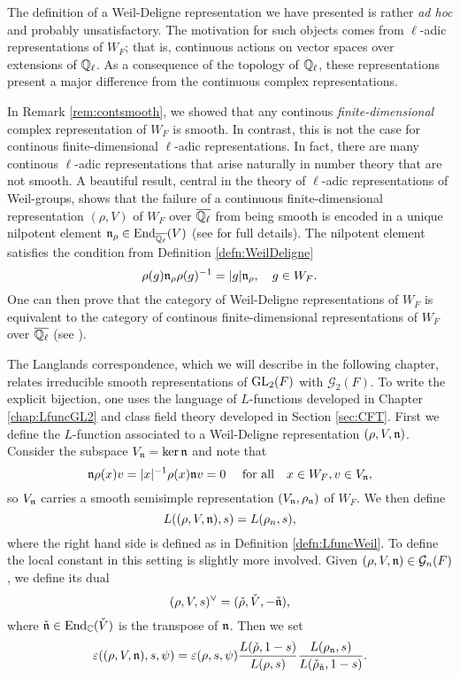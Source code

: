 \begin{rem}
    The definition of a Weil-Deligne representation we have presented is rather \textit{ad hoc} and probably unsatisfactory. The motivation for such objects comes from $\ell$-adic representations of $W_F$; that is, continuous actions on vector spaces over extensions of $\mathbb{Q}_\ell$. As a consequence of the topology of $\mathbb{Q}_\ell$, these representations present a major difference from the continuous complex representations. 

    In Remark \ref{rem:contsmooth}, we showed that any continous \textit{finite-dimensional} complex representation of $W_F$ is smooth. In contrast, this is not the case for continous finite-dimensional $\ell$-adic representations. In fact, there are many continous $\ell$-adic representations that arise naturally in number theory that are not smooth. A beautiful result, central in the theory of $\ell$-adic representations of Weil-groups, shows that the failure of a continuous finite-dimensional representation $(\rho,V)$ of $W_F$ over $\overline{\mathbb{Q}_\ell}$ from being smooth is encoded in a unique nilpotent element $\mathfrak{n}_\rho\in\mathrm{End}_{\overline{\mathbb{Q}_\ell}}(V)$ (see \cite[32.5 Theorem]{BH1} for full details). The nilpotent element satisfies the condition from Definition \ref{defn:WeilDeligne}
    $$\rho(g)\mathfrak{n}_\rho\rho(g)^{-1}=|g|\mathfrak{n}_\rho,\quad g\in W_F.$$
    One can then prove that the category of Weil-Deligne representations of $W_F$ is equivalent to the category of continous finite-dimensional representations of $W_F$ over $\overline{\mathbb{Q}_\ell}$ (see \cite[32.6 Theorem]{BH1}). 
\end{rem}

The Langlands correspondence, which we will describe in the following chapter, relates irreducible smooth representations of $\mathrm{GL}_2(F)$ with $\mathcal{G}_2(F)$. To write the explicit bijection, one uses the language of $L$-functions developed in Chapter \ref{chap:LfuncGL2} and class field theory developed in Section \ref{sec:CFT}.
First we define the $L$-function associated to a Weil-Deligne representation $(\rho,V,\mathfrak{n})$. Consider the subspace $V_{\mathfrak{n}}=\ker\mathfrak{n}$ and note that 
$$\mathfrak{n}\rho(x)v=|x|^{-1}\rho(x)\mathfrak{n} v=0\quad\text{ for all}\quad x\in W_F,v\in V_{\mathfrak{n}},$$
so $V_{\mathfrak{n}}$ carries a smooth semisimple representation $(V_{\mathfrak{n}},\rho_{\mathfrak{n}})$ of $W_F$. We then define 
$$L((\rho,V,\mathfrak{n}),s)=L(\rho_n,s),$$
where the right hand side is defined as in Definition \ref{defn:LfuncWeil}. To define the local constant in this setting is slightly more involved. Given $(\rho,V,\mathfrak{n})\in\mathcal{G}_n(F)$, we define its dual
$$(\rho,V,s)^\vee=(\check\rho,\check{V},-\check{\mathfrak{n}}),$$
where $\check{\mathfrak{n}}\in\mathrm{End}_{\mathbb{C}}(\check{V})$ is the transpose of $\mathfrak{n}$. Then we set
$$\varepsilon((\rho,V,\mathfrak{n}),s,\psi)=\varepsilon(\rho,s,\psi)\frac{L(\check{\rho},1-s)}{L(\rho,s)}\frac{L(\rho_{\mathfrak{n}},s)}{L(\check{\rho}_{\check{\mathfrak{n}}},1-s)}.$$

\newpage
